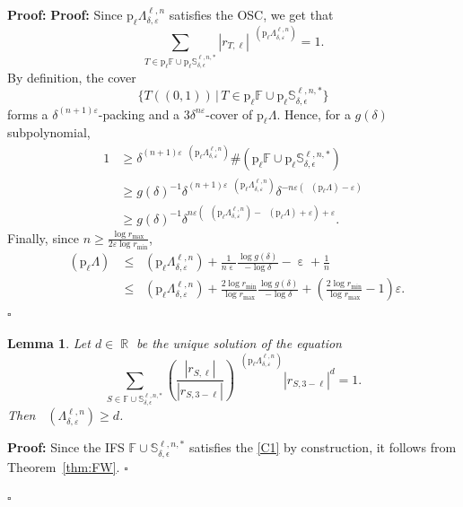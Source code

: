\documentclass[a4paper, 11pt]{article}
\newenvironment{Proof}{\noindent \textbf{Proof:}}{\hfill$\square$\\}
\DeclareMathOperator{\R}{\mathbb{R}}
\DeclareMathOperator{\eps}{\varepsilon}
\DeclareMathOperator{\dB}{\dim_{\mathrm{B}}}
\numberwithin{equation}{section}
\theoremstyle{plain}
\newtheorem{lemma}[theorem]{Lemma}
\theoremstyle{remark}
\theoremstyle{definition}
\begin{document}
\begin{Proof}
\begin{Proof}
Since $\mathrm{p}_\ell \Lambda_{\delta,\varepsilon}^{\ell,n}$ satisfies the OSC, we get that
$$
\sum_{T\in\mathrm{p}_\ell \mathbb{F} \cup \mathrm{p}_\ell \mathbb{S}_{\delta,\epsilon}^{\ell,n,*}}|r_{T,\ell}|^{\dB(\mathrm{p}_\ell \Lambda_{\delta,\varepsilon}^{\ell,n})}=1.
$$
By definition, the cover
$$
\{T((0,1))\, \big|\, T\in\mathrm{p}_\ell \mathbb{F} \cup \mathrm{p}_\ell \mathbb{S}_{\delta,\epsilon}^{\ell,n,*}\}
$$
forms a $\delta^{(n+1)\varepsilon}$-packing and a $3\delta^{n\varepsilon}$-cover of $\mathrm{p}_\ell\Lambda$. Hence, for a $g(\delta)$ subpolynomial,
\begin{align*}
1&\geq \delta^{(n+1)\varepsilon\dB(\mathrm{p}_\ell \Lambda_{\delta,\varepsilon}^{\ell,n})}\#(\mathrm{p}_\ell \mathbb{F} \cup \mathrm{p}_\ell \mathbb{S}_{\delta,\epsilon}^{\ell,n,*})\\
&\geq g(\delta)^{-1} \delta^{(n+1)\varepsilon\dB(\mathrm{p}_\ell \Lambda_{\delta,\varepsilon}^{\ell,n})}\delta^{-n\varepsilon(\dB(\mathrm{p}_\ell\Lambda)-\varepsilon)}\\
&\geq g(\delta)^{-1} \delta^{n\varepsilon(\dB(\mathrm{p}_\ell \Lambda_{\delta,\varepsilon}^{\ell,n})-\dB(\mathrm{p}_\ell\Lambda)+\varepsilon)+\varepsilon}.
\end{align*}
Finally, since $n\geq\frac{\log r_{\max}}{2\varepsilon\log r_{\min}}$, 
\begin{align*}
\dB(\mathrm{p}_\ell\Lambda)&\leq \dB(\mathrm{p}_\ell \Lambda_{\delta,\varepsilon}^{\ell,n}) + \frac{1}{n\eps}\frac{\log g(\delta)}{-\log \delta} - \eps +\frac{1}{n}\\
&\leq \dB(\mathrm{p}_\ell \Lambda_{\delta,\varepsilon}^{\ell,n}) + \frac{2\log r_{\min}}{\log r_{\max}} \frac{\log g(\delta)}{-\log\delta} + \left(\frac{2\log r_{\min}}{\log r_{\max}}-1\right)\varepsilon.
\end{align*}
\end{Proof}

\begin{lemma} \label{lemma:dim2d}
Let $d \in \R$ be the unique solution of the equation
\begin{equation*}
\sum_{S\in \mathbb{F} \cup \mathbb{S}_{\delta,\epsilon}^{\ell,n,*}}\left(\frac{|r_{S,\ell}|}{|r_{S,3-\ell}|}\right)^{\dB(\mathrm{p}_\ell \Lambda_{\delta,\varepsilon}^{\ell,n})}|r_{S,3-\ell}|^d=1.
\end{equation*}
Then $\dB(\Lambda_{\delta,\varepsilon}^{\ell,n})\geq d$.
\end{lemma}

\begin{Proof}
Since the IFS $\mathbb{F} \cup \mathbb{S}_{\delta,\epsilon}^{\ell,n,*}$ satisfies the \ref{C1} by construction, it follows from Theorem~\ref{thm:FW}.
\end{Proof}




\end{Proof}
\end{document}
